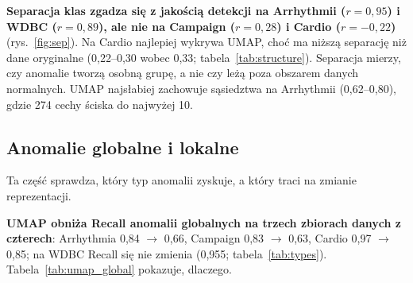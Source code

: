 \documentclass[11pt,a4paper]{article}
\begin{document}
\textbf{Separacja klas zgadza się z jakością detekcji na Arrhythmii
($r=0{,}95$) i WDBC ($r=0{,}89$), ale nie na Campaign ($r=0{,}28$) i Cardio
($r=-0{,}22$)} (rys.~\ref{fig:sep}). Na Cardio najlepiej wykrywa UMAP, choć
ma niższą separację niż dane oryginalne (0,22--0,30 wobec 0,33;
tabela~\ref{tab:structure}). Separacja mierzy, czy anomalie tworzą osobną
grupę, a nie czy leżą poza obszarem danych normalnych. UMAP najsłabiej
zachowuje sąsiedztwa na Arrhythmii (0,62--0,80), gdzie 274 cechy ściska do
najwyżej 10.

\FloatBarrier
\subsection{Anomalie globalne i lokalne}

Ta część sprawdza, który typ anomalii zyskuje, a który traci na zmianie
reprezentacji.

\begin{table}[H]
  \centering\small
  \caption{Recall anomalii globalnych i lokalnych najlepszego (według
  walidacji) detektora w każdej reprezentacji. Zgłoszone punkty -- odsetek
  obserwacji testowych zgłoszonych jako anomalie; im więcej zgłoszeń, tym
  łatwiej o wysoki Recall.}
  \label{tab:types}
\end{table}

\textbf{UMAP obniża Recall anomalii globalnych na trzech zbiorach danych
z czterech}: Arrhythmia 0,84 $\rightarrow$ 0,66, Campaign 0,83 $\rightarrow$
0,63, Cardio 0,97 $\rightarrow$ 0,85; na WDBC Recall się nie zmienia (0,955;
tabela~\ref{tab:types}). Tabela~\ref{tab:umap_global} pokazuje, dlaczego.

\begin{table}[H]
  \centering\small
  \caption{Anomalie globalne przed i po UMAP (dane oryginalne $\rightarrow$
  UMAP, średnio po podziałach). Procenty -- jak często losowa anomalia
  globalna leży dalej niż losowa obserwacja normalna (50\,\% -- brak różnicy)
  od 10 najbliższych punktów uczących i od środka części uczącej. Detektor --
  wybrany na walidacji w danych oryginalnych / w UMAP.}
  \label{tab:umap_global}
\end{table}
\end{document}
